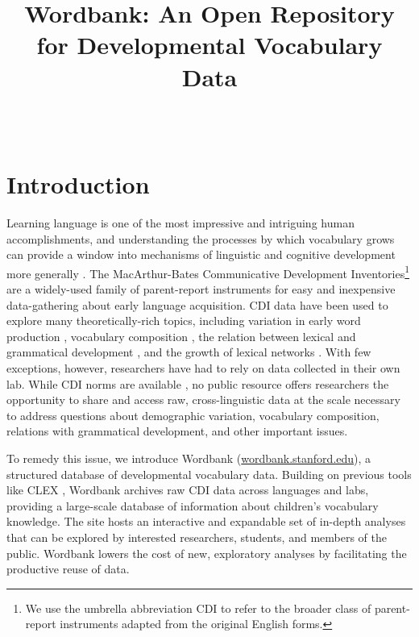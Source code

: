 \documentclass[man,noapacite]{apa}
\title{Wordbank: An Open Repository for Developmental Vocabulary Data}
\author{~}
\affiliation{~}
\begin{document}
\maketitle

\section{Introduction}


Learning language is one of the most impressive and intriguing human accomplishments, and understanding the processes by which vocabulary grows can provide a window into mechanisms of linguistic and cognitive development more generally \cite{bloom2002}. The MacArthur-Bates Communicative Development Inventories\footnote{We use the umbrella abbreviation CDI to refer to the broader class of parent-report instruments adapted from the original English forms.} \cite{fenson1994,fenson2007} are a widely-used family of parent-report instruments for easy and inexpensive data-gathering about early language acquisition. CDI data have been used to explore many theoretically-rich topics, including variation in early word production \cite{fenson1994}, vocabulary composition \cite{bates1994}, the relation between lexical and grammatical development 
\cite{bates1999}, and the growth of lexical networks \cite{hills2009}. With few exceptions, however, researchers have had to rely on data collected in their own lab. While CDI norms are available \cite{fenson2007,jorgensen2010}, no public resource offers researchers the opportunity to share and access raw, cross-linguistic data at the scale necessary to address questions about demographic variation, vocabulary composition, relations with grammatical development, and other important issues.

To remedy this issue, we introduce Wordbank (\url{wordbank.stanford.edu}), a structured database of developmental vocabulary data. Building on previous tools like CLEX \cite{jorgensen2010}, Wordbank archives raw CDI data across languages and labs, providing a large-scale database of information about children's vocabulary knowledge. The site hosts an interactive and expandable set of in-depth analyses that can be explored by interested researchers, students, and members of the public. Wordbank lowers the cost of new, exploratory analyses by facilitating the productive reuse of data.
\end{document}
